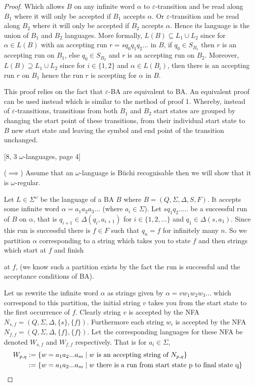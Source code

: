 \documentclass[a4paper,12pt]{report}
\theoremstyle{definition}
\begin{document}
\begin{proof}
Which allows $B$ on any infinite word $\alpha$ to $\varepsilon$-transition and be read along $B_1$ where it will only be accepted if $B_1$ accepts $\alpha$. Or $\varepsilon$-transition and be read along $B_2$ where it will only be accepted if $B_2$ accepts $\alpha$.  Hence its language is the union of $B_1$ and $B_2$ languages. More formally, $L(B) \subseteq L_1 \cup L_2$ since for $\alpha\in L(B)$ with an accepting run $r=sq_0q_1q_2...$ in $B$, if $q_0 \in S_{B_1}$ then $r$ is an accepting run on $B_1$, else $q_0 \in S_{B_2}$ and $r$ is an accepting run on $B_2$. Moreover, $L(B) \supseteq L_1 \cup L_2$ since for $i\in\{1,2\}$ and $\alpha\in L(B_i)$, then there is an accepting run $r$ on $B_1$ hence the run $r$ is accepting for $\alpha$ in $B$. 

This proof relies on the fact that $\varepsilon$-BA are equivalent to BA. An equivalent proof can be used instead which is similar to the method of proof 1. Whereby, instead of $\varepsilon$-transitions, transitions from both $B_1$ and $B_2$ start states are grouped by changing the start point of these transitions, from their individual start state to $B$ new start state and leaving the symbol and end point of the transition unchanged. 

[8, 3 $\omega$-languages, page 4]

($\implies$) Assume that an $\omega$-language is Büchi recognisable then we will show that it is $\omega$-regular.

Let $L\in\Sigma^\omega$ be the language of a BA $B$ where $B=(Q,\Sigma, \Delta,S, F)$. It accepts some infinite word $\alpha=a_1a_2a_3...$ (where $a_i\in\Sigma$). Let  $sq_1q_2.....$ be a successful run of $B$ on $\alpha$, that is $q_{i+1}\in\Delta(q_i,a_{i+1})$ for $i\in\{1,2,...\}$ and $q_1\in\Delta(s,a_1)$. Since this run is successful there is $f\in F$ such that $q_n=f$ for infinitely many $n$. So we partition $\alpha$ corresponding to a string which takes you to state $f$ and then strings which start at $f$ and finish

at $f$, (we know such a partition exists by the fact the run is successful and the acceptance conditions of BA). 

Let us rewrite the infinite word $\alpha$ as strings given by $\alpha=vw_1w_2w_3...$ which correspond to this partition, the initial string $v$ takes you from the start state to the first occurrence of $f$.  Clearly string $v$ is accepted by the NFA $N_{s,f} =(Q,\Sigma, \Delta, \{s\},\{f\})$. Furthermore each string $w_i$ is accepted by the NFA $N_{f,f}=(Q,\Sigma, \Delta, \{f\},\{f\})$. Let the corresponding languages for these NFA be denoted $W_{s,f}$ and $W_{f,f}$ respectively. That is for $a_i\in\Sigma$, 
\begin{align}
    W_{p,q} &:= \{w=a_1a_2...a_m \mid w \text{ is an accepting string of } N_{p,q}\}\notag \\
    &:= \{ w=a_1a_2...a_m \mid w \text{ there is a run from start state p to final state q}\} \notag
\end{align}


\end{proof}
\end{document}
